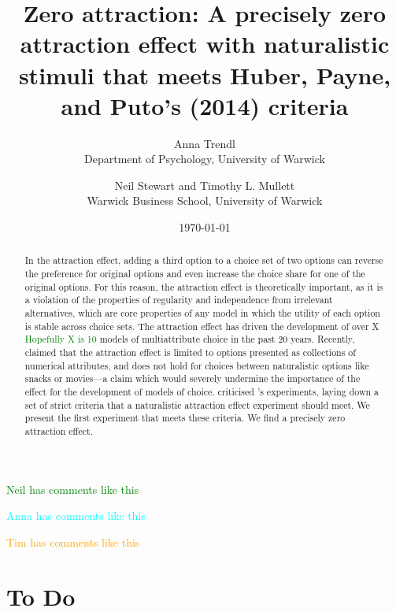 \documentclass[12pt, a4paper]{article}
\title{}
\author{}
\date{}
\title{Zero attraction: A precisely zero attraction effect with naturalistic stimuli that meets Huber, Payne, and Puto's (2014) criteria}
\author{Anna Trendl\\Department of Psychology, University of Warwick \and Neil Stewart and Timothy L. Mullett\\Warwick Business School, University of Warwick}
\date{\today}
\newcommand{\NS}[1] {{\textcolor{green}{#1}}}
\newcommand{\AT}[1] {{\textcolor{cyan}{#1}}}
\newcommand{\TM}[1] {{\textcolor{orange}{#1}}}
\begin{document}
\begin{titlepage}
\maketitle

\newpage

\begin{abstract}
In the attraction effect, adding a third option to a choice set of two options can reverse the preference for original options and even increase the choice share for one of the original options. For this reason, the attraction effect is theoretically important, as it is a violation of the properties of regularity and independence from irrelevant alternatives, which are core properties of any model in which the utility of each option is stable across choice sets. The attraction effect has driven the development of over X \NS{Hopefully X is 10} models of multiattribute choice in the past 20 years. Recently,  claimed that the attraction effect is limited to options presented as collections of numerical attributes, and does not hold for choices between naturalistic options like snacks or movies---a claim which would severely undermine the importance of the effect for the development of models of choice.  criticised \citeauthor{Frederick2014}'s experiments, laying down a set of strict criteria that a naturalistic attraction effect experiment should meet. We present the first experiment that meets these criteria. We find a precisely zero attraction effect. 
\end{abstract}
\end{titlepage}

\NS{Neil has comments like this}

\AT{Anna has comments like this}

\TM{Tim has comments like this}


\section{To Do}
\end{document}
